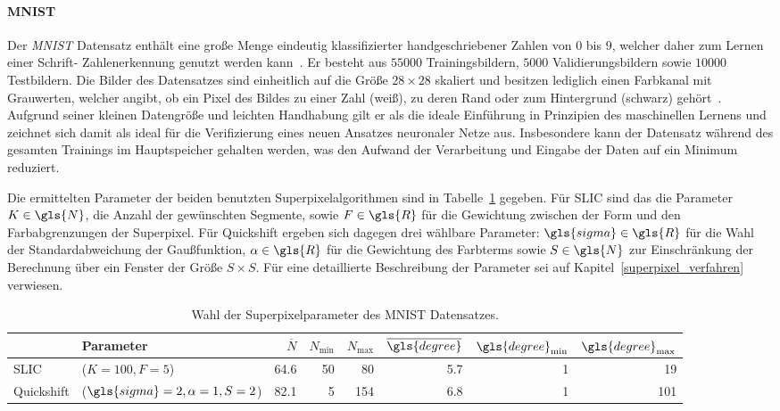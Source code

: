 \paragraph{MNIST}
\label{mnist}

Der \emph{\gls{MNIST}} Datensatz enthält eine große Menge eindeutig klassifizierter handgeschriebener Zahlen von $0$ bis $9$, welcher daher zum Lernen einer Schrift- \bzw{} Zahlenerkennung genutzt werden kann~\cite{mnist}.
Er besteht aus $55000$ Trainingsbildern, $5000$ Validierungsbildern sowie $10000$ Testbildern.
Die Bilder des Datensatzes sind einheitlich auf die Größe $28 \times 28$ skaliert und besitzen lediglich einen Farbkanal mit Grauwerten, welcher angibt, ob ein Pixel des Bildes zu einer Zahl (weiß), zu deren Rand oder zum Hintergrund (schwarz) gehört~\cite{mnist}.
Aufgrund seiner kleinen Datengröße und leichten Handhabung gilt er als die ideale Einführung in Prinzipien des maschinellen Lernens und zeichnet sich damit als ideal für die Verifizierung eines neuen Ansatzes \bzgl{} neuronaler Netze aus.
Insbesondere kann der Datensatz während des gesamten Trainings im Hauptspeicher gehalten werden, was den Aufwand \bzgl{} der Verarbeitung und Eingabe der Daten auf ein Minimum reduziert.

Die ermittelten Parameter \bzgl{} der beiden benutzten Superpixelalgorithmen sind in Tabelle~\ref{tab:mnist} gegeben.
Für \gls{SLIC} sind das die Parameter $K \in \gls{N}$, \dhe{} die Anzahl der gewünschten Segmente, sowie $F \in \gls{R}$ für die Gewichtung zwischen der Form und den Farbabgrenzungen der Superpixel.
Für Quickshift ergeben sich dagegen drei wählbare Parameter: $\gls{sigma} \in \gls{R}$ für die Wahl der Standardabweichung der Gaußfunktion, $\alpha \in \gls{R}$ für die Gewichtung des Farbterms sowie $S \in \gls{N}$ zur Einschränkung der Berechnung über ein Fenster der Größe $S \times S$.
Für eine detaillierte Beschreibung der Parameter sei auf Kapitel~\ref{superpixel_verfahren} verwiesen.
\begin{table}[t]
\centering
\begin{tabular}{llrrrrrr}
  \toprule
  & Parameter & $\overline{N}$ & $N_{\min}$ & $N_{\max}$ & $\overline{\gls{degree}}$ & $\gls{degree}_{\min}$ & $\gls{degree}_{\max}$\\
  \midrule
  \gls{SLIC} & ($K=100, F=5$) & 64.6 & 50 & 80 & 5.7 & 1 & 19\\
  Quickshift & ($\gls{sigma}=2, \alpha=1, S=2$) & 82.1 & 5 & 154 & 6.8 & 1 & 101\\
  \bottomrule
\end{tabular}
\caption[\gls{MNIST} Superpixelparameter]{Wahl der Superpixelparameter des \gls{MNIST} Datensatzes.}
\label{tab:mnist}
\end{table}

